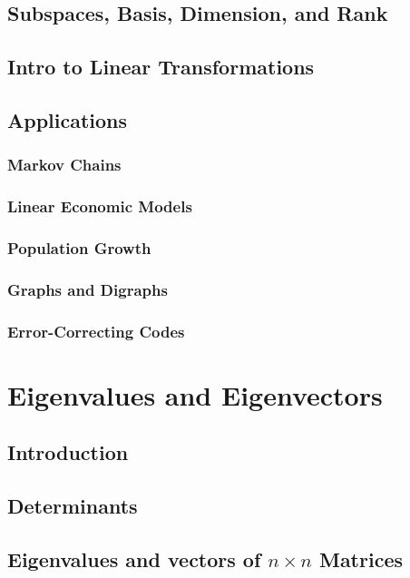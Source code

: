 \documentclass{article}
\begin{document}
	\subsection{Subspaces, Basis, Dimension, and Rank}
	
	\subsection{Intro to Linear Transformations}
	
	\subsection{Applications}
	
		\subsubsection{Markov Chains}
		\subsubsection{Linear Economic Models}
		\subsubsection{Population Growth}
		\subsubsection{Graphs and Digraphs}
		\subsubsection{Error-Correcting Codes}
	
\clearpage
\section{Eigenvalues and Eigenvectors} %

	\subsection{Introduction}
	
	\subsection{Determinants}
	
	\subsection{Eigenvalues and vectors of $n \times n$ Matrices}
	
\end{document}
